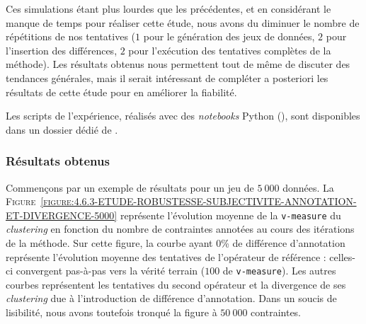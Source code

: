 			\begin{leftBarWarning}
				Ces simulations étant plus lourdes que les précédentes, et en considérant le manque de temps pour réaliser cette étude, nous avons du diminuer le nombre de répétitions de nos tentatives ($1$ pour le génération des jeux de données, $2$ pour l'insertion des différences, $2$ pour l'exécution des tentatives complètes de la méthode).
				Les résultats obtenus nous permettent tout de même de discuter des tendances générales, mais il serait intéressant de compléter a posteriori les résultats de cette étude pour en améliorer la fiabilité.
			\end{leftBarWarning}
			
			\begin{leftBarInformation}
				Les scripts de l'expérience, réalisés avec des \textit{notebooks} Python (\cite{van-rossum-drake:2009:python-reference-manual}), sont disponibles dans un dossier dédié de \cite{schild:2021:cognitivefactory-interactiveclusteringcomparativestudy}.
			\end{leftBarInformation}
		
		
		\subsubsection{Résultats obtenus}
			
			Commençons par un exemple de résultats pour un jeu de $5~000$ données.
			La \textsc{Figure~\ref{figure:4.6.3-ETUDE-ROBUSTESSE-SUBJECTIVITE-ANNOTATION-ET-DIVERGENCE-5000}} représente l'évolution moyenne de la \texttt{v-measure} du \textit{clustering} en fonction du nombre de contraintes annotées au cours des itérations de la méthode.
			Sur cette figure, la courbe ayant $0$\% de différence d'annotation représente l'évolution moyenne des tentatives de l'opérateur de référence : celles-ci convergent pas-à-pas vers la vérité terrain ($100$ de \texttt{v-measure}).
			Les autres courbes représentent les tentatives du second opérateur et la divergence de ses \textit{clustering} due à l'introduction de différence d'annotation.
			Dans un soucis de lisibilité, nous avons toutefois tronqué la figure à $50~000$ contraintes.

